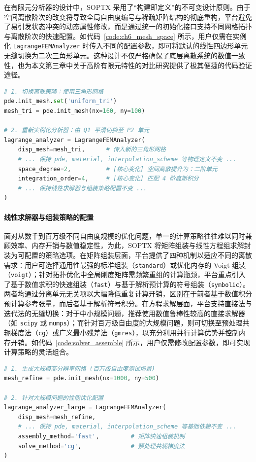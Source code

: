 在有限元分析器的设计中，SOPTX 采用了“构建即定义”的不可变设计原则。由于空间离散阶次的改变将导致全局自由度编号与稀疏矩阵结构的彻底重构，平台避免了易引发状态冲突的动态属性修改，而是通过统一的初始化接口支持不同网格拓扑与离散阶次的快速配置。如代码~\ref{code:ch6_mesh_space} 所示，用户仅需在实例化 \texttt{LagrangeFEMAnalyzer} 时传入不同的配置参数，即可将默认的线性四边形单元无缝切换为二次三角形单元。这种设计不仅严格确保了底层离散系统的数值一致性，也为本文第三章中关于高阶有限元特性的对比研究提供了极其便捷的代码验证途径。
\begin{lstlisting}[language=Python, 
	caption={网格拓扑与有限元空间阶次的切换配置}, 
	label={code:ch6_mesh_space}, 
	basicstyle=\footnotesize\ttfamily,  
]
# 1. 切换离散策略：使用三角形网格
pde.init_mesh.set('uniform_tri')
mesh_tri = pde.init_mesh(nx=160, ny=100) 

# 2. 重新实例化分析器：由 Q1 平滑切换至 P2 单元
lagrange_analyzer = LagrangeFEMAnalyzer(
	disp_mesh=mesh_tri,      # 传入新的三角形网格
	# ... 保持 pde, material, interpolation_scheme 等物理定义不变 ...
	space_degree=2,          # [核心变化] 空间离散提升为：二阶单元
	integration_order=4,     # [核心变化] 匹配 4 阶高斯积分
	# ... 保持线性求解器与组装策略配置不变 ...
)
\end{lstlisting}

\paragraph*{线性求解器与组装策略的配置}

面对从数千到百万级不同自由度规模的优化问题，单一的计算策略往往难以同时兼顾效率、内存开销与数值稳定性，为此，SOPTX 将矩阵组装与线性方程组求解封装为可配置的策略选项。在矩阵组装层面，平台提供了四种机制以适应不同的离散需求：用户可选择通用性最强的标准组装（\texttt{standard}）或优化内存的 Voigt 组装（\texttt{voigt}）；针对拓扑优化中全局刚度矩阵需频繁重组的计算瓶颈，平台重点引入了基于数值求积的快速组装（\texttt{fast}）与基于解析预计算的符号组装（\texttt{symbolic}）。两者均通过分离单元无关项以大幅降低重复计算开销，区别在于前者基于数值积分预计算参考张量，而后者基于解析符号积分。在方程求解层面，平台支持直接法与迭代法的无缝切换：对于中小规模问题，推荐使用数值鲁棒性较高的直接求解器（如 \texttt{scipy} 或 \texttt{mumps}）；而针对百万级自由度的大规模问题，则可切换至预处理共轭梯度法（\texttt{cg}）或广义最小残差法（\texttt{gmres}），以充分利用并行计算优势并控制内存开销。如代码~\ref{code:solver_assemble} 所示，用户仅需修改配置参数，即可实现计算策略的灵活组合。

\begin{lstlisting}[language=Python, 
	caption={线性求解器与组装策略的切换配置}, 
	label={code:solver_assemble}, 
	basicstyle=\footnotesize\ttfamily,  
]
# 1. 生成大规模高分辨率网格 (百万级自由度测试场景)
mesh_refine = pde.init_mesh(nx=1000, ny=500)

# 2. 针对大规模问题的性能优化配置
lagrange_analyzer_large = LagrangeFEMAnalyzer(
	disp_mesh=mesh_refine,
	# ... 保持 pde, material, interpolation_scheme 等基础依赖不变 ...
	assembly_method='fast',         # 矩阵快速组装机制
	solve_method='cg',              # 预处理共轭梯度法
)
\end{lstlisting}

